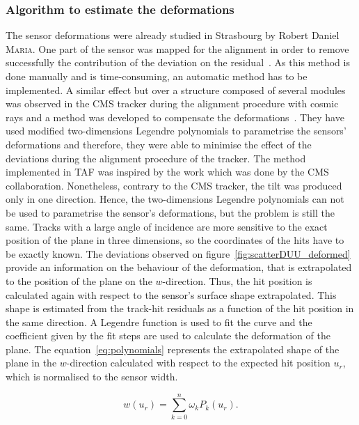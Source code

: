       \subsubsection{Algorithm to estimate the deformations}

      The sensor deformations were already studied in Strasbourg by Robert Daniel \textsc{Maria}.
      One part of the sensor was mapped for the alignment in order to remove successfully the contribution of the deviation on the residual~\cite{maria}.
      As this method is done manually and is time-consuming, an automatic method has to be implemented.
      A similar effect but over a structure composed of several modules was observed in the CMS tracker during the alignment procedure with cosmic rays and a method was developed to compensate the deformations~\cite{CMSalignment}. 
      They have used modified two-dimensions Legendre polynomials to parametrise the sensors' deformations and therefore, they were able to minimise the effect of the deviations during the alignment procedure of the tracker.
      The method implemented in \gls{TAF} was inspired by the work which was done by the CMS collaboration.
      Nonetheless, contrary to the CMS tracker, the tilt was produced only in one direction.
      Hence, the two-dimensions Legendre polynomials can not be used to parametrise the sensor's deformations, but the problem is still the same.
      Tracks with a large angle of incidence are more sensitive to the exact position of the plane in three dimensions, so the coordinates of the hits have to be exactly known.
      The deviations observed on figure~\ref{fig:scatterDUU_deformed} provide an information on the behaviour of the deformation, that is extrapolated to the position of the plane on the $w$-direction.
      Thus, the hit position is calculated again with respect to the sensor's surface shape extrapolated.
      This shape is estimated from the track-hit residuals as a function of the hit position in the same direction.
      A Legendre function is used to fit the curve and the coefficient given by the fit steps are used to calculate the deformation of the plane.
      The equation~\ref{eq:polynomials} represents the extrapolated shape of the plane in the $w$-direction calculated with respect to the expected hit position $u_{r}$, which is normalised to the sensor width.

      \begin{equation}
        w\left(u_{r}\right) = \sum_{k=0}^n \omega_{k}P_{k}\left(u_{r}\right).
        \label{eq:polynomials}
      \end{equation}
      
